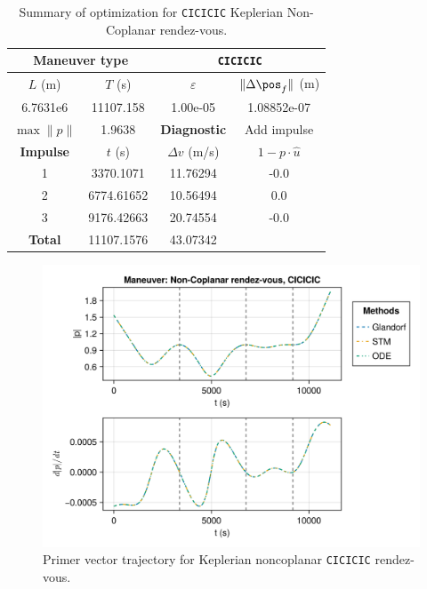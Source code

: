 \begin{table}[htpb]
    \centering
    \begin{tabular}{cccc} \toprule
    \multicolumn{2}{c}{\textbf{Maneuver type}} & \multicolumn{2}{c}{\texttt{CICICIC}} \\ \midrule
    \(L\) (m) & \(T\) (s) & \(\varepsilon\) & \(\lVert \Delta \pos_{f} \rVert\) (m)    \\ \midrule
    6.7631e6          & 11107.158          & 1.00e-05                & 1.08852e-07                        \\ \midrule
    \(\max \lVert p \rVert\) & 1.9638     & \textbf{Diagnostic}   & Add impulse        \\ \midrule
    \textbf{Impulse} & \(t\) (s) & \(\Delta v\) (m/s) & \(1 - p \cdot \hat{u}\) \\ \midrule
    1                 & 3370.1071          & 11.76294             & -0.0                    \\
    2                 & 6774.61652          & 10.56494             & 0.0                    \\
    3                 & 9176.42663          & 20.74554             & -0.0                    \\\midrule
    \textbf{Total}   & 11107.1576          & 43.07342             &                     \\ \bottomrule   
    \end{tabular}
    \caption{Summary of optimization for \texttt{CICICIC} Keplerian Non-Coplanar rendez-vous.}
    \label{tab:tb_nr_CICICIC_tab}
\end{table}

\begin{figure}[htbp]
    \centering
    \includegraphics[width=\linewidth]{../results/two_body/ipv_noncop/CICICIC_primer_vector.png}
    \caption{Primer vector trajectory for Keplerian noncoplanar \texttt{CICICIC} rendez-vous.}
    \label{fig:tb_ncop_CICICIC_pv}
\end{figure}


